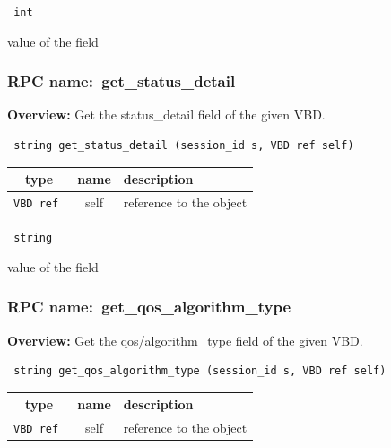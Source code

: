 \vspace{0.3cm}

{\tt 
int
}


value of the field
\vspace{0.3cm}
\vspace{0.3cm}
\vspace{0.3cm}
\subsubsection{RPC name:~get\_status\_detail}

{\bf Overview:} 
Get the status\_detail field of the given VBD.

\begin{verbatim} string get_status_detail (session_id s, VBD ref self)\end{verbatim}



 
\vspace{0.3cm}
\begin{tabular}{|c|c|p{7cm}|}
 \hline
{\bf type} & {\bf name} & {\bf description} \\ \hline
{\tt VBD ref } & self & reference to the object \\ \hline 

\end{tabular}

\vspace{0.3cm}

{\tt 
string
}


value of the field
\vspace{0.3cm}
\vspace{0.3cm}
\vspace{0.3cm}
\subsubsection{RPC name:~get\_qos\_algorithm\_type}

{\bf Overview:} 
Get the qos/algorithm\_type field of the given VBD.

\begin{verbatim} string get_qos_algorithm_type (session_id s, VBD ref self)\end{verbatim}



 
\vspace{0.3cm}
\begin{tabular}{|c|c|p{7cm}|}
 \hline
{\bf type} & {\bf name} & {\bf description} \\ \hline
{\tt VBD ref } & self & reference to the object \\ \hline 

\end{tabular}

